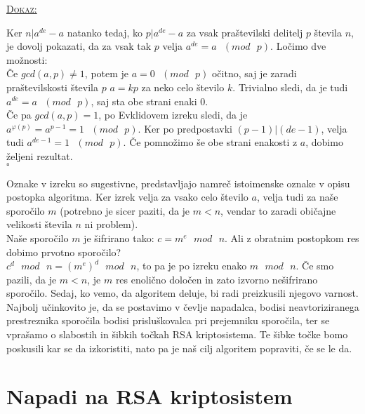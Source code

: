 \documentclass[a4paper, 12pt]{article} %
\newenvironment{matematika}[1]{
\textcolor{bostonuniversityred}{\underline{\textsc{#1:}}}
}{
}
\begin{document}
\begin{matematika}{Dokaz}
Ker $n | a^{de} - a$ natanko tedaj, ko $p | a^{de} - a$ za vsak praštevilski delitelj $p$ števila $n$, je dovolj pokazati, da za vsak tak $p$ velja $a^{de} = a \text{ } (mod \text{ } p)$. Ločimo dve možnosti: \\
Če $gcd(a, p) \neq 1$, potem je $a = 0 \text{ } (mod \text{ } p)$ očitno, saj je zaradi praštevilskosti števila $p$ $a = kp$ za neko celo število $k$. Trivialno sledi, da je tudi $a^{de} = a \text{ } (mod \text{ } p)$, saj sta obe strani enaki $0$. \\
Če pa $gcd(a, p) = 1$, po Evklidovem izreku sledi, da je $a^{\varphi (p)} = a^{p-1} = 1 \text{ } (mod \text{ } p)$. Ker po predpostavki $(p-1)|(de-1)$, velja tudi $a^{de-1} = 1 \text{ } (mod \text{ } p)$. Če pomnožimo še obe strani enakosti z $a$, dobimo željeni rezultat. \\ \hspace*{\fill} $\square$ \\
\end{matematika}

Oznake v izreku so sugestivne, predstavljajo namreč istoimenske oznake v opisu postopka algoritma. Ker izrek velja za vsako celo število $a$, velja tudi za naše sporočilo $m$ (potrebno je sicer paziti, da je $m < n$, vendar to zaradi običajne velikosti števila $n$ ni problem). \\
Naše sporočilo $m$ je šifrirano tako: $c = m^e \text{ } mod \text{ } n$. Ali z obratnim postopkom res dobimo prvotno sporočilo? \\
$c^d \text{ } mod \text{ } n = (m^{e})^{d} \text{ } mod \text{ } n$, to pa je po izreku enako $m \text{ } mod \text{ } n$. Če smo pazili, da je $m < n$, je $m$ res enolično določen in zato izvorno nešifrirano sporočilo.
\newline
\newline
Sedaj, ko vemo, da algoritem deluje, bi radi preizkusili njegovo varnost. Najbolj učinkovito je, da se postavimo v čevlje napadalca, bodisi neavtoriziranega prestreznika sporočila bodisi prisluškovalca pri prejemniku sporočila, ter se vprašamo o slabostih in šibkih točkah RSA kriptosistema. Te šibke točke bomo poskusili kar se da izkoristiti, nato pa je naš cilj algoritem popraviti, če se le da.

\newpage

\section{Napadi na RSA kriptosistem}
\end{document}
